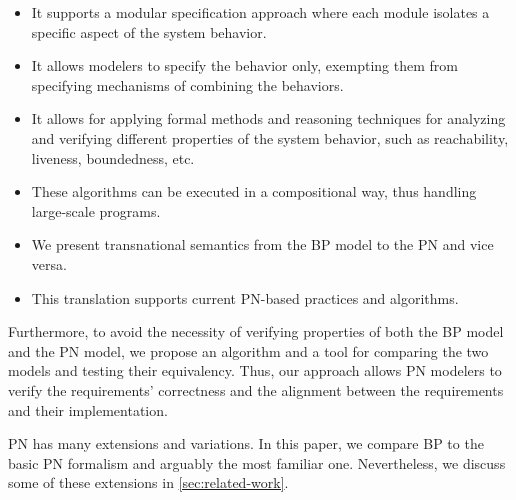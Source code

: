 \documentclass[10pt,journal,compsoc]{IEEEtran}
\theoremstyle{definition}
\begin{document}
\begin{itemize}
\item It supports a modular specification approach where each module isolates a specific aspect of the system behavior.

\item It allows modelers to specify the behavior only, exempting them from specifying mechanisms of combining the behaviors.

\item It allows for applying formal methods and reasoning techniques for analyzing and verifying different properties of the system behavior, such as reachability, liveness, boundedness, etc. 

\item These algorithms can be executed in a compositional way, thus handling large-scale programs.

\item We present transnational semantics from the BP model to the PN and vice versa.

\item This translation supports current PN-based practices and algorithms.
\end{itemize}

Furthermore, to avoid the necessity of verifying properties of both the BP model and the PN model, we propose an algorithm and a tool for comparing the two models and testing their equivalency. Thus, our approach allows PN modelers to verify the requirements' correctness and the alignment between the requirements and their implementation.

PN has many extensions and variations. In this paper, we compare BP to the basic PN formalism and arguably the most familiar one. Nevertheless, we discuss some of these extensions in \autoref{sec:related-work}.


\end{document}
